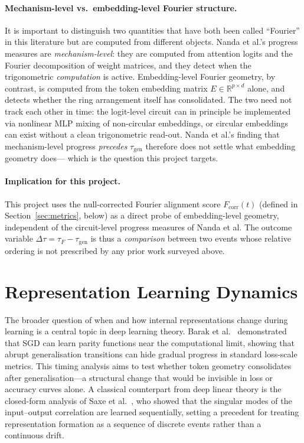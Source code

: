 \documentclass[12pt,openany,oneside,a4paper]{book}
\newcommand{\secn}[1]{Section~\ref{#1}}
\newcommand{\taug}{\tau_{\mathrm{gen}}}
\newcommand{\tauf}{\tau_{F}}
\newcommand{\Dtau}{\Delta\tau}
\newcommand{\fcorr}{F_{\mathrm{corr}}}
\begin{document}
\paragraph{Mechanism-level vs.\ embedding-level Fourier structure.}
It is important to distinguish two quantities that have both been
called ``Fourier'' in this literature but are computed from different
objects.
Nanda et al.'s progress measures are \emph{mechanism-level}: they are
computed from attention logits and the Fourier decomposition of
weight matrices, and they detect when the trigonometric
\emph{computation} is active.
Embedding-level Fourier geometry, by contrast, is computed from the
token embedding matrix $E\in\mathbb{R}^{p\times d}$ alone, and
detects whether the ring arrangement itself has consolidated.
The two need not track each other in time: the logit-level circuit
can in principle be implemented via nonlinear MLP mixing of
non-circular embeddings, or circular embeddings can exist without a
clean trigonometric read-out.
Nanda et al.'s finding that mechanism-level progress \emph{precedes}
$\taug$ therefore does not settle what embedding geometry does---
which is the question this project targets.

\paragraph{Implication for this project.}
This project uses the null-corrected Fourier alignment score
$\fcorr(t)$ (defined in \secn{sec:metrics}, below) as a direct probe
of embedding-level geometry, independent of the circuit-level
progress measures of Nanda et al.
The outcome variable $\Dtau = \tauf - \taug$ is thus a
\emph{comparison} between two events whose relative ordering is not
prescribed by any prior work surveyed above.

\section{Representation Learning Dynamics}

The broader question of when and how internal representations change
during learning is a central topic in deep learning theory.
Barak et al.\ \cite{barak2022hidden} demonstrated that SGD can learn
parity functions near the computational limit, showing that abrupt
generalisation transitions can hide gradual progress in standard
loss-scale metrics.
This timing analysis aims to test whether token geometry consolidates
after generalisation---a structural change that would be invisible
in loss or accuracy curves alone.
A classical counterpart from deep linear theory is the closed-form
analysis of Saxe et al.\ \cite{saxe2014exact}, who showed that the
singular modes of the input--output correlation are learned
sequentially, setting a precedent for treating representation
formation as a sequence of discrete events rather than a continuous
drift.
\end{document}
